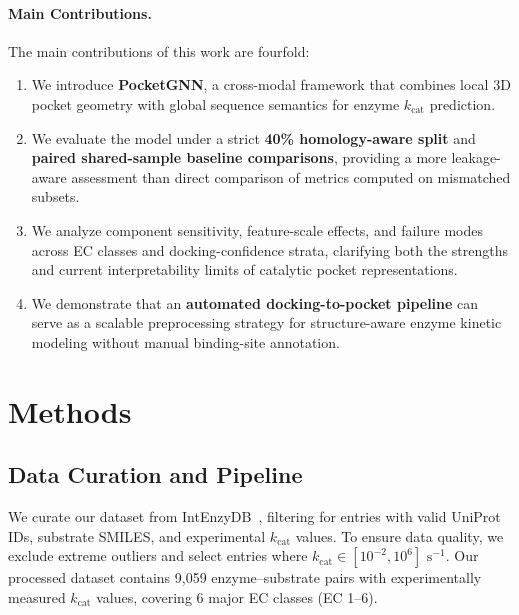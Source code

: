 \documentclass[11pt]{article}
\begin{document}
\paragraph{Main Contributions.}
The main contributions of this work are fourfold:
\begin{enumerate}
    \item We introduce \textbf{PocketGNN}, a cross-modal framework that combines local 3D pocket geometry with global sequence semantics for enzyme $k_{\text{cat}}$ prediction.
    \item We evaluate the model under a strict \textbf{40\% homology-aware split} and \textbf{paired shared-sample baseline comparisons}, providing a more leakage-aware assessment than direct comparison of metrics computed on mismatched subsets.
    \item We analyze component sensitivity, feature-scale effects, and failure modes across EC classes and docking-confidence strata, clarifying both the strengths and current interpretability limits of catalytic pocket representations.
    \item We demonstrate that an \textbf{automated docking-to-pocket pipeline} can serve as a scalable preprocessing strategy for structure-aware enzyme kinetic modeling without manual binding-site annotation.
\end{enumerate}

\section{Methods}
\label{sec:methods}

\subsection{Data Curation and Pipeline}
\label{sec:data_pipeline}

We curate our dataset from IntEnzyDB~\citep{yan2022intenzydb}, filtering for entries with valid UniProt IDs, substrate SMILES, and experimental $k_{\text{cat}}$ values. To ensure data quality, we exclude extreme outliers and select entries where $k_{\text{cat}} \in [10^{-2}, 10^{6}] \text{ s}^{-1}$. Our processed dataset contains 9,059 enzyme--substrate pairs with experimentally measured $k_{\text{cat}}$ values, covering 6 major EC classes (EC 1--6).
\end{document}
